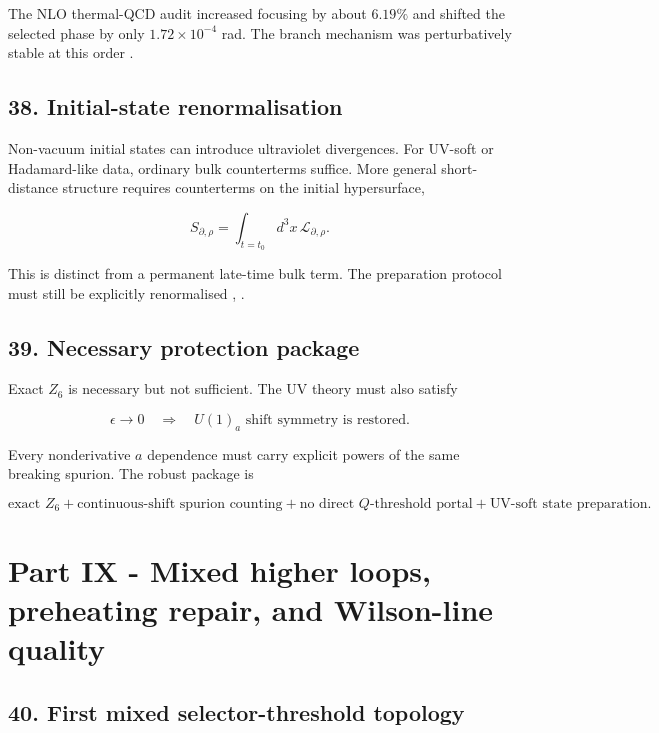 \documentclass[
]{article}
\begin{document}
The NLO thermal-QCD audit increased focusing by about \(6.19\%\) and
shifted the selected phase by only \(1.72\times10^{-4}\) rad. The branch
mechanism was perturbatively stable at this order
.

\subsection{38. Initial-state
renormalisation}\label{initial-state-renormalisation}

Non-vacuum initial states can introduce ultraviolet divergences. For
UV-soft or Hadamard-like data, ordinary bulk counterterms suffice. More
general short-distance structure requires counterterms on the initial
hypersurface,

\[
S_{\partial,\rho}
=\int_{t=t_0}d^3x\,\mathcal L_{\partial,\rho}.
\]

This is distinct from a permanent late-time bulk term. The preparation
protocol must still be explicitly renormalised
,
.

\subsection{39. Necessary protection
package}\label{necessary-protection-package}

Exact \(Z_6\) is necessary but not sufficient. The UV theory must also
satisfy

\[
\epsilon\rightarrow0
\quad\Longrightarrow\quad
U(1)_a\text{ shift symmetry is restored}.
\]

Every nonderivative \(a\) dependence must carry explicit powers of the
same breaking spurion. The robust package is

\[
\boxed{
\text{exact }Z_6
+\text{continuous-shift spurion counting}
+\text{no direct }Q\text{-threshold portal}
+\text{UV-soft state preparation}.
}
\]

\section{Part IX - Mixed higher loops, preheating repair, and
Wilson-line
quality}\label{part-ix---mixed-higher-loops-preheating-repair-and-wilson-line-quality}

\subsection{40. First mixed selector-threshold
topology}\label{first-mixed-selector-threshold-topology}
\end{document}
